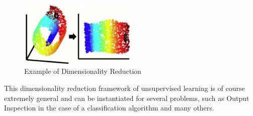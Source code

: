 \begin{itemize}
            \vspace{5mm}

            \begin{figure}[h]
                  \centering
                  \includegraphics[width=0.5\textwidth]{../img/Dim_reduction_example}
                  \caption{Example of Dimensionality Reduction}
            \end{figure}

            \vspace{5mm}

            This dimensionality reduction framework of unsupervised
            learning is of course extremely general and can be
            instantiated for several problems, such as Output Inspection
            in the case of a classification algorithm and many others.
\end{itemize}